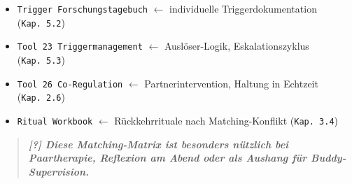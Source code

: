 \begin{itemize}
\tightlist
\item
  \texttt{T}\texttt{rigger}\texttt{\ F}\texttt{orschungstagebuch} $\leftarrow$ individuelle Triggerdokumentation (\texttt{Kap.\ }\texttt{5.2})
\item
  \texttt{T}\texttt{ool}\texttt{\ }\texttt{23}\texttt{\ }\texttt{T}\texttt{riggermanagement} $\leftarrow$ Auslöser-Logik, Eskalationszyklus (\texttt{Kap.\ }\texttt{5.3})
\item
  \texttt{T}\texttt{ool}\texttt{\ }\texttt{26}\texttt{\ C}\texttt{o}\texttt{-R}\texttt{egulation} $\leftarrow$ Partnerintervention, Haltung in Echtzeit (\texttt{Kap.\ }\texttt{2.6})
\item
  \texttt{R}\texttt{itual}\texttt{\ W}\texttt{orkbook} $\leftarrow$ Rückkehrrituale nach Matching-Konflikt (\texttt{Kap.\ }\texttt{3.4})
\end{itemize}

\begin{quote}
\emph{\textbf{[?] Diese Matching-Matrix ist besonders nützlich bei Paartherapie, Reflexion am Abend oder als Aushang für Buddy-Supervision.}}
\end{quote}
